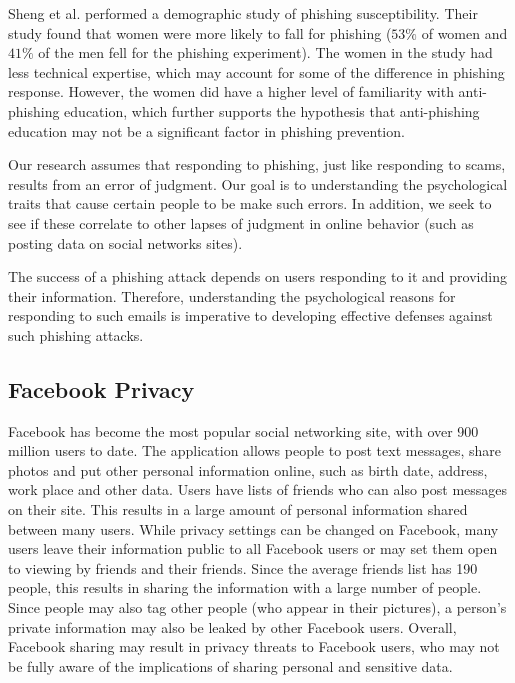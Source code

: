 \documentclass{sig-alternate}
\begin{document}
Sheng et al. \cite {SHK10} performed a demographic study of phishing susceptibility. Their study found that women were more likely to fall for phishing ($53\%$ of women and $41\%$ of the men fell for the phishing experiment). The women in the study had less technical expertise, which may account for some of the difference in phishing response. However, the women did have a higher level of familiarity with anti-phishing education, which further supports the hypothesis that anti-phishing education may not be a significant factor in phishing prevention.





Our research assumes that responding to phishing, just like responding to scams, results from an error of judgment. Our goal is to understanding the psychological traits that cause certain people to be make such errors. In addition, we seek to see if these correlate to other lapses of judgment in online behavior (such as posting data on social networks sites).

The success of a phishing attack depends on users responding to it and providing their information. Therefore, understanding the psychological 
reasons for responding to such emails is imperative to 
developing
effective defenses against such phishing attacks.


\subsection{Facebook Privacy} 



Facebook has become the most popular social networking site, with over 900 million users to date. The application allows people to post text messages, share photos and put other personal information online, such as birth 
date, address, work place and other data. Users have lists of friends who can also post messages on their site. This results in a large amount of personal information shared between many users. While privacy settings can be changed on Facebook, many users leave their information public to all Facebook users or may set them open to viewing by friends and their friends. Since the average friends list has 190 people, this results in sharing the information with a large number of people. Since people may also tag other people (who appear in their pictures), a person's private information may also be leaked by other Facebook users. Overall, Facebook sharing may result in privacy threats to Facebook users, who may not be fully aware of the implications of sharing personal and sensitive data. 
\end{document}
